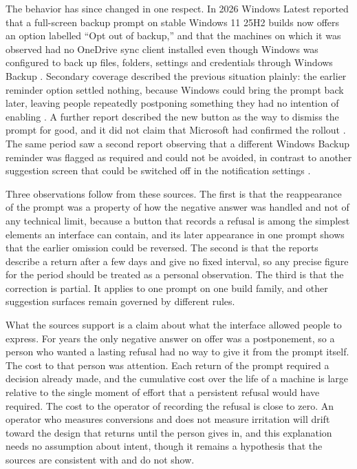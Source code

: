 \documentclass[11pt]{article}
\begin{document}
The behavior has since changed in one respect. In 2026 Windows Latest reported that a full-screen backup prompt on stable Windows 11 25H2 builds now offers an option labelled ``Opt out of backup,'' and that the machines on which it was observed had no OneDrive sync client installed even though Windows was configured to back up files, folders, settings and credentials through Windows Backup \cite{elevenforum2026}. Secondary coverage described the previous situation plainly: the earlier reminder option settled nothing, because Windows could bring the prompt back later, leaving people repeatedly postponing something they had no intention of enabling \cite{digitaltrends2026}. A further report described the new button as the way to dismiss the prompt for good, and it did not claim that Microsoft had confirmed the rollout \cite{pcmag2026}. The same period saw a second report observing that a different Windows Backup reminder was flagged as required and could not be avoided, in contrast to another suggestion screen that could be switched off in the notification settings \cite{techradar2026}.

Three observations follow from these sources. The first is that the reappearance of the prompt was a property of how the negative answer was handled and not of any technical limit, because a button that records a refusal is among the simplest elements an interface can contain, and its later appearance in one prompt shows that the earlier omission could be reversed. The second is that the reports describe a return after a few days and give no fixed interval, so any precise figure for the period should be treated as a personal observation. The third is that the correction is partial. It applies to one prompt on one build family, and other suggestion surfaces remain governed by different rules.

What the sources support is a claim about what the interface allowed people to express. For years the only negative answer on offer was a postponement, so a person who wanted a lasting refusal had no way to give it from the prompt itself. The cost to that person was attention. Each return of the prompt required a decision already made, and the cumulative cost over the life of a machine is large relative to the single moment of effort that a persistent refusal would have required. The cost to the operator of recording the refusal is close to zero. An operator who measures conversions and does not measure irritation will drift toward the design that returns until the person gives in, and this explanation needs no assumption about intent, though it remains a hypothesis that the sources are consistent with and do not show.
\end{document}
